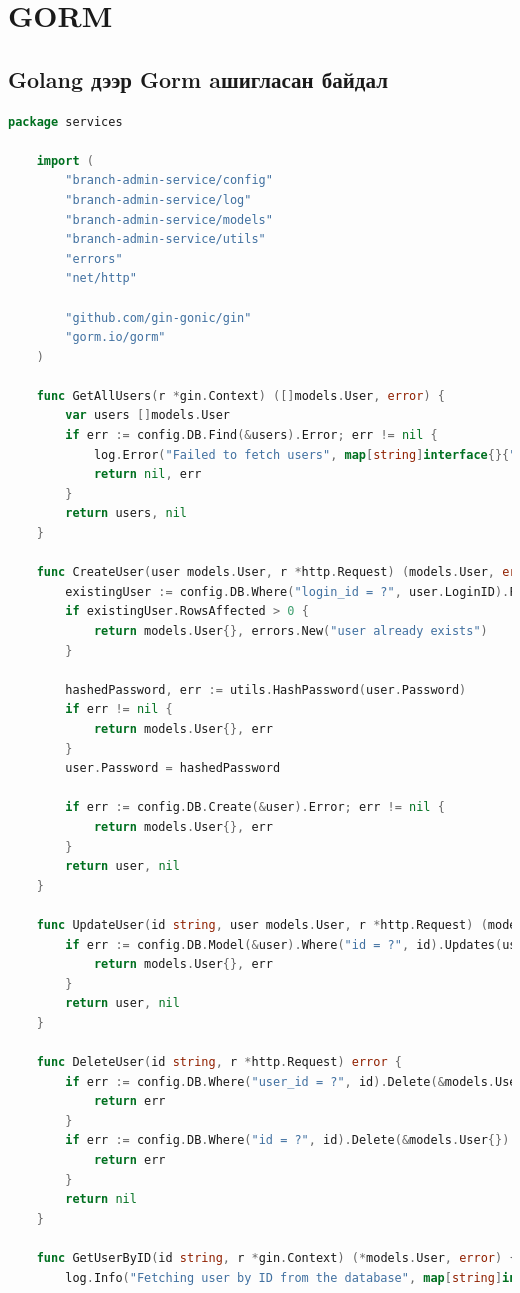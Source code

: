 \section{GORM}

\subsection{Golang дээр Gorm aшигласан байдал}
\begin{lstlisting}[language=Go, frame=single]
	package services

	import (
		"branch-admin-service/config"
		"branch-admin-service/log"
		"branch-admin-service/models"
		"branch-admin-service/utils"
		"errors"
		"net/http"
	
		"github.com/gin-gonic/gin"
		"gorm.io/gorm"
	)
	
	func GetAllUsers(r *gin.Context) ([]models.User, error) {
		var users []models.User
		if err := config.DB.Find(&users).Error; err != nil {
			log.Error("Failed to fetch users", map[string]interface{}{"error": err.Error()}, r)
			return nil, err
		}
		return users, nil
	}
	
	func CreateUser(user models.User, r *http.Request) (models.User, error) {
		existingUser := config.DB.Where("login_id = ?", user.LoginID).First(&models.User{})
		if existingUser.RowsAffected > 0 {
			return models.User{}, errors.New("user already exists")
		}
	
		hashedPassword, err := utils.HashPassword(user.Password)
		if err != nil {
			return models.User{}, err
		}
		user.Password = hashedPassword
	
		if err := config.DB.Create(&user).Error; err != nil {
			return models.User{}, err
		}
		return user, nil
	}
	
	func UpdateUser(id string, user models.User, r *http.Request) (models.User, error) {
		if err := config.DB.Model(&user).Where("id = ?", id).Updates(user).Error; err != nil {
			return models.User{}, err
		}
		return user, nil
	}
	
	func DeleteUser(id string, r *http.Request) error {
		if err := config.DB.Where("user_id = ?", id).Delete(&models.UserRole{}).Error; err != nil {
			return err
		}
		if err := config.DB.Where("id = ?", id).Delete(&models.User{}).Error; err != nil {
			return err
		}
		return nil
	}
	
	func GetUserByID(id string, r *gin.Context) (*models.User, error) {
		log.Info("Fetching user by ID from the database", map[string]interface{}{"id": id}, r)
	

\end{lstlisting}
